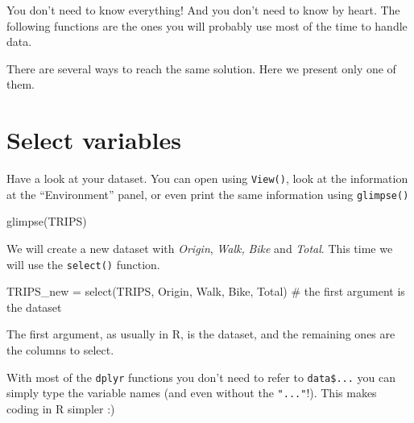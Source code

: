 \documentclass[
  letterpaper,
  DIV=11,
  numbers=noendperiod]{scrreprt}
\newenvironment{Shaded}{\begin{snugshade}}{\end{snugshade}}
\newcommand{\CommentTok}[1]{\textcolor[rgb]{0.37,0.37,0.37}{#1}}
\newcommand{\FunctionTok}[1]{\textcolor[rgb]{0.28,0.35,0.67}{#1}}
\newcommand{\NormalTok}[1]{\textcolor[rgb]{0.00,0.23,0.31}{#1}}
\newcommand{\OtherTok}[1]{\textcolor[rgb]{0.00,0.23,0.31}{#1}}
\begin{document}
You don't need to know everything! And you don't need to know by heart.
The following functions are the ones you will probably use most of the
time to handle data.

\begin{tcolorbox}[enhanced jigsaw, breakable, left=2mm, colframe=quarto-callout-tip-color-frame, leftrule=.75mm, bottomrule=.15mm, arc=.35mm, rightrule=.15mm, colback=white, opacityback=0, toprule=.15mm]
\begin{minipage}[t]{5.5mm}
\textcolor{quarto-callout-tip-color}{\faLightbulb}
\end{minipage}%
\begin{minipage}[t]{\textwidth - 5.5mm}

There are several ways to reach the same solution. Here we present only
one of them.

\end{minipage}%
\end{tcolorbox}

\section{Select variables}\label{select-variables}

Have a look at your dataset. You can open using \texttt{View()}, look at
the information at the ``Environment'' panel, or even print the same
information using \texttt{glimpse()}

\begin{Shaded}
\begin{Highlighting}[]
\FunctionTok{glimpse}\NormalTok{(TRIPS)}
\end{Highlighting}
\end{Shaded}

We will create a new dataset with \emph{Origin}, \emph{Walk,}
\emph{Bike} and \emph{Total}. This time we will use the
\texttt{select()} function.

\begin{Shaded}
\begin{Highlighting}[]
\NormalTok{TRIPS\_new }\OtherTok{=} \FunctionTok{select}\NormalTok{(TRIPS, Origin, Walk, Bike, Total) }\CommentTok{\# the first argument is the dataset}
\end{Highlighting}
\end{Shaded}

The first argument, as usually in R, is the dataset, and the remaining
ones are the columns to select.

With most of the \texttt{dplyr} functions you don't need to refer to
\texttt{data\$...} you can simply type the variable names (and even
without the \texttt{"..."}!). This makes coding in R simpler :)
\end{document}

